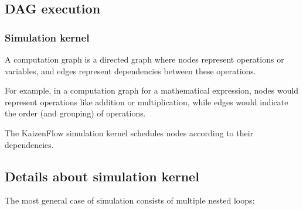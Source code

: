 \documentclass[11pt, reqno]{amsart}
\theoremstyle{definition}
\theoremstyle{remark}
\begin{document}
\subsection{DAG execution}

\subsubsection{Simulation kernel}

A computation graph is a directed graph where nodes represent operations or
variables, and edges represent dependencies between these operations.

For example, in a computation graph for a mathematical expression, nodes would
represent operations like addition or multiplication, while edges would
indicate the order (and grouping) of operations.

The KaizenFlow simulation kernel schedules nodes according to their
dependencies.

\subsection{Details about simulation kernel}

The most general case of simulation consists of multiple nested loops:
\end{document}
